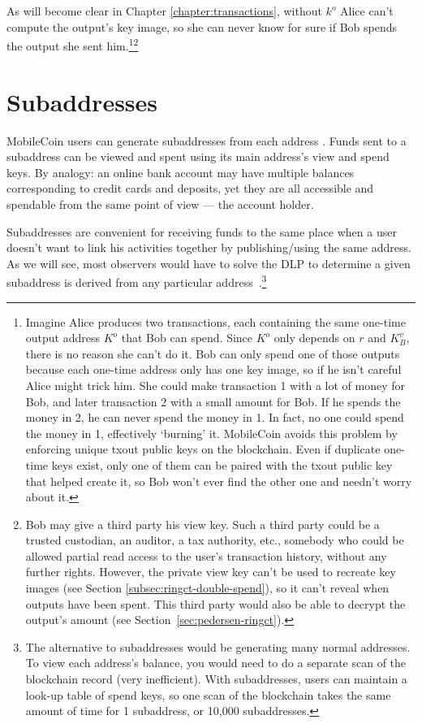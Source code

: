 As will become clear in Chapter \ref{chapter:transactions}, without $k^o$ Alice can't compute the output's key image, so she can never know for sure if Bob spends the output she sent him.\footnote{Imagine Alice produces two transactions, each containing the same one-time output address $K^o$ that Bob can spend. Since $K^o$ only depends on $r$ and $K_B^v$, there is no reason she can't do it. Bob can only spend one of those outputs because each one-time address only has one key image, so if he isn't careful Alice might trick him. She could make transaction 1 with a lot of money for Bob, and later transaction 2 with a small amount for Bob. If he spends the money in 2, he can never spend the money in 1. In fact, no one could spend the money in 1, effectively `burning' it. MobileCoin avoids this problem by enforcing unique txout public keys on the blockchain. Even if duplicate one-time keys exist, only one of them can be paired with the txout public key that helped create it, so Bob won't ever find the other one and needn't worry about it.}\footnote{Bob may give a third party his view key. Such a third party could be a trusted custodian, an auditor, a tax authority, etc., somebody who could be allowed partial read access to the user’s transaction history, without any further rights. However, the private view key can't be used to recreate key images (see Section \ref{subsec:ringct-double-spend}), so it can't reveal when outputs have been spent. This third party would also be able to decrypt the output's amount (see Section~\ref{sec:pedersen-ringct}).} %



\section{Subaddresses}
\label{sec:subaddresses}

MobileCoin users can generate subaddresses from each address \cite{MRL-0006-subaddresses}. Funds sent to a subaddress can be viewed and spent using its main address’s view and spend keys. By analogy: an online bank account may have multiple balances corresponding to credit cards and deposits, yet they are all accessible and spendable from the same point of view --- the account holder.

Subaddresses are convenient for receiving funds to the same place when a user doesn't want to link his activities together by publishing/using the same address. As we will see, most observers would have to solve the DLP to determine a given subaddress is derived from any particular address~\cite{MRL-0006-subaddresses}.\footnote{The alternative to subaddresses would be generating many normal addresses. To view each address's balance, you would need to do a separate scan of the blockchain record (very inefficient). With subaddresses, users can maintain a look-up table of spend keys, so one scan of the blockchain takes the same amount of time for 1 subaddress, or 10,000 subaddresses.}


